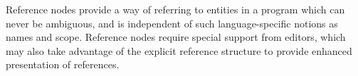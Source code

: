 Reference nodes provide a way of referring to entities in a program which can never be ambiguous, and is independent of such language-specific notions as names and scope. Reference nodes require special support from editors, which may also take advantage of the explicit reference structure to provide enhanced presentation of references.




